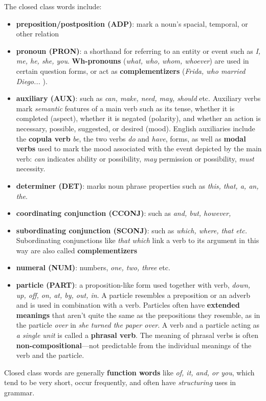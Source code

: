 \documentclass[11pt]{article}
\begin{document}
The closed class words include:
\begin{itemize}
\item \textbf{preposition/postposition (ADP)}: mark a noun's spacial, temporal, or other relation
\item \textbf{pronoun (PRON)}: a shorthand for referring to an entity or event such as \emph{I, me, he, she, you}.  \textbf{Wh-pronouns} (\emph{what, who, whom, whoever}) are used in certain question forms, or act as \textbf{complementizers} (\emph{Frida, who married Diego... }).
\item \textbf{auxiliary (AUX)}: such as \emph{can, make, need, may, should} etc. Auxiliary verbs mark \emph{semantic} features of a main verb such as its tense, whether
it is completed (aspect), whether it is negated (polarity), and whether an action is necessary, possible, suggested, or desired (mood). English auxiliaries include the
\textbf{copula verb} \emph{be}, the two verbs \emph{do} and \emph{have}, forms, as well as \textbf{modal verbs} used to mark the mood associated with the event depicted by the main verb: \emph{can} indicates ability or possibility, \emph{may} permission or possibility, \emph{must} necessity.
\item \textbf{determiner (DET)}: marks noun phrase properties such as \emph{this, that, a, an, the}.
\item \textbf{coordinating conjunction (CCONJ)}: such as \emph{and, but, however,}
\item \textbf{subordinating conjunction (SCONJ)}: such as \emph{which, where, that etc.} Subordinating conjunctions like \emph{that} \emph{which} link a verb to its argument in this way are also called \textbf{complementizers}
\item \textbf{numeral (NUM)}: numbers, \emph{one, two, three} etc.
\item \textbf{particle (PART)}: a proposition-like form used together with verb, \emph{down, up, off, on, at, by, out, in}. A particle resembles a preposition or an adverb and is used in combination with a verb. Particles often have \textbf{extended meanings} that aren’t quite the same as the prepositions they resemble, as in the particle \emph{over} in \emph{she turned the paper over}. A verb and a particle acting as \emph{a single unit} is called a \textbf{phrasal verb}. The meaning of phrasal verbs is often \textbf{non-compositional}—not predictable from the individual meanings of the verb and the particle.
\end{itemize} Closed class words are generally \textbf{function words} like \emph{of, it, and, or you}, which tend to be very short, occur frequently, and often have \emph{structuring} uses in grammar.
\end{document}
